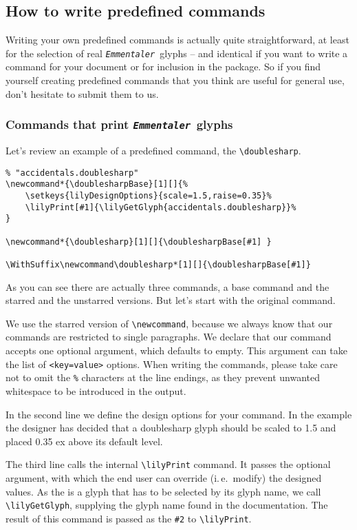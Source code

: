\documentclass{article}
\newcommand*{\emmentaler}{\texttt{\textit{Emmentaler }}}
\newcommand*{\cmd}[1]{\texttt{\textbackslash #1}}
\begin{document}
\subsection{How to write predefined commands}
\label{subsec:howto_predefined_commands}
Writing your own predefined commands is actually quite straightforward, at least for the selection of real \emmentaler glyphs -- and identical if you want to write a command for your document or for inclusion in the package.
So if you find yourself creating predefined commands that you think are useful for general use, don't hesitate to submit them to us. 

\subsubsection{Commands that print \emmentaler glyphs}
\label{subsubsec:commands_emmentaler-glyphs}
Let's review an example of a predefined command, the \cmd{doublesharp}.

\begin{verbatim}
% "accidentals.doublesharp"
\newcommand*{\doublesharpBase}[1][]{%
	\setkeys{lilyDesignOptions}{scale=1.5,raise=0.35}%
	\lilyPrint[#1]{\lilyGetGlyph{accidentals.doublesharp}}%
}

\newcommand*{\doublesharp}[1][]{\doublesharpBase[#1] }

\WithSuffix\newcommand\doublesharp*[1][]{\doublesharpBase[#1]}
\end{verbatim}
As you can see there are actually three commands, a base command and the starred and the unstarred versions.
But let's start with the original command.

We use the starred version of \cmd{newcommand}, because we always know that our commands are restricted to single paragraphs.
We declare that our command accepts one optional argument, which defaults to empty. 
This argument can take the list of \texttt{<key=value>} options.
When writing the commands, please take care not to omit the \texttt{\%} characters at the line endings, as they prevent unwanted whitespace to be introduced in the output.

In the second line we define the design options for your command.
In the example the designer has decided that a doublesharp glyph should be scaled to 1.5 and placed 0.35 ex above its default level.

The third line calls the internal \cmd{lilyPrint} command. 
It passes the optional argument, with which the end user can override (i.\,e.\ modify) the designed values.
As the \doublesharp is a glyph that has to be selected by its glyph name, we call \cmd{lilyGetGlyph}, supplying the glyph name found in the documentation.
The result of this command is passed as the \texttt{\#2} to \cmd{lilyPrint}.
\end{document}
